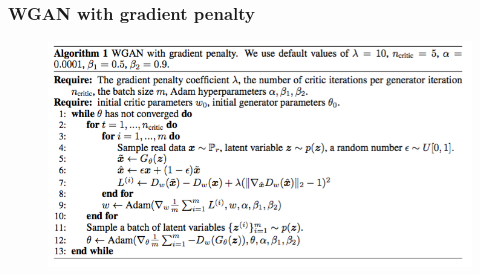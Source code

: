 \documentclass{beamer}
\begin{document}
\begin{frame}
\frametitle{WGAN with gradient penalty}
\begin{figure}
\centering
\includegraphics[width=1.07\textwidth]{i_wgan.png}
\end{figure}
\end{frame}
\end{document}
